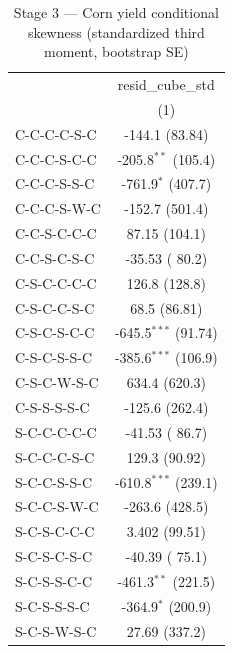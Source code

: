
\begin{table}[H]
   \caption{\label{tab:corn_jp_skew} Stage 3 --- Corn yield conditional skewness (standardized third moment, bootstrap SE)}
   \bigskip
   \centering
   \begin{tabular}{lc}
      \toprule
                                       & resid\_cube\_std\\   
                                       & (1)\\  
      \midrule 
      C-C-C-C-S-C                      & -144.1 (83.84)\\   
      C-C-C-S-C-C                      & -205.8$^{**}$ (105.4)\\   
      C-C-C-S-S-C                      & -761.9$^{*}$ (407.7)\\   
      C-C-C-S-W-C                      & -152.7 (501.4)\\   
      C-C-S-C-C-C                      & 87.15 (104.1)\\   
      C-C-S-C-S-C                      & -35.53 ( 80.2)\\   
      C-S-C-C-C-C                      & 126.8 (128.8)\\   
      C-S-C-C-S-C                      &  68.5 (86.81)\\   
      C-S-C-S-C-C                      & -645.5$^{***}$ (91.74)\\   
      C-S-C-S-S-C                      & -385.6$^{***}$ (106.9)\\   
      C-S-C-W-S-C                      & 634.4 (620.3)\\   
      C-S-S-S-S-C                      & -125.6 (262.4)\\   
      S-C-C-C-C-C                      & -41.53 ( 86.7)\\   
      S-C-C-C-S-C                      & 129.3 (90.92)\\   
      S-C-C-S-S-C                      & -610.8$^{***}$ (239.1)\\   
      S-C-C-S-W-C                      & -263.6 (428.5)\\   
      S-C-S-C-C-C                      & 3.402 (99.51)\\   
      S-C-S-C-S-C                      & -40.39 ( 75.1)\\   
      S-C-S-S-C-C                      & -461.3$^{**}$ (221.5)\\   
      S-C-S-S-S-C                      & -364.9$^{*}$ (200.9)\\   
      S-C-S-W-S-C                      & 27.69 (337.2)\\   

\end{tabular}
\end{table}

